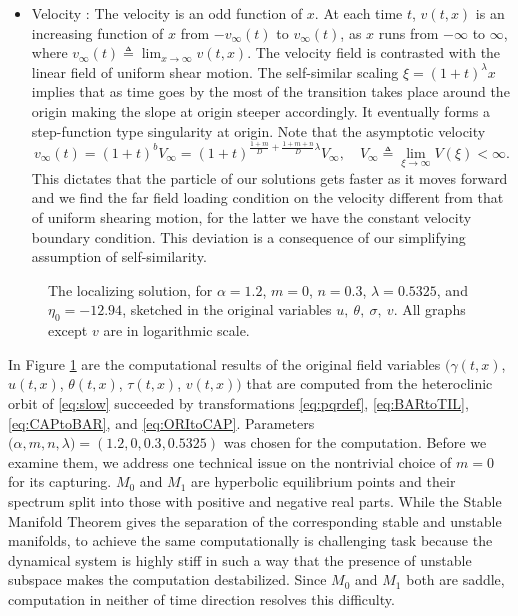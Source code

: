 \documentclass[a4paper,11pt]{article}
\def\red{\color{red}}
\theoremstyle{remark}
\begin{document}
\begin{itemize}
\item Velocity : The velocity is an odd function of $x$. At each time $t$, $v(t,x)$ is an increasing function of $x$ from $-v_\infty(t)$ to $v_\infty(t)$, as $x$ runs from $-\infty$ to $\infty$, where $v_\infty(t)\triangleq \lim_{x \rightarrow \infty} v(t,x)$. The velocity field is contrasted with the linear field of uniform shear motion. The self-similar scaling  $\xi=(1+t)^\lambda x$ implies that as time goes by the most of the transition takes place around the origin making the slope at origin steeper accordingly. It eventually forms a step-function type singularity at origin. Note that the asymptotic velocity $$v_\infty(t)=(1+t)^{b}V_\infty = (1+t)^{\frac{1+m}{D} + \frac{1+m+n}{D}\lambda}V_\infty, \quad V_\infty \triangleq \lim_{\xi \rightarrow \infty} V(\xi) <\infty.$$
This dictates that the particle of our solutions gets faster as it moves forward and we find the far field loading condition on the velocity different from that of uniform shearing motion, for the latter we have the constant velocity boundary condition. This deviation is a consequence of our simplifying assumption of self-similarity.
\end{itemize}

\begin{figure}[ht]
 \centering
\caption{The localizing solution, for $\alpha=1.2$, $m=0$, $n=0.3$, $\lambda =0.5325$, and $\eta_0=-12.94$, sketched in the original variables $u, \ \theta, \ \sigma, \ v$.
All graphs except $v$ are in logarithmic scale.} \label{fig:computation}
\end{figure}

In Figure \ref{fig:computation} are the computational results of the original field variables $\big(\gamma(t,x)$, $u(t,x)$, $\theta(t,x)$, $\tau(t,x)$, $v(t,x)\big)$ that are computed from the heteroclinic orbit of \eqref{eq:slow} succeeded by transformations \eqref{eq:pqrdef}, \eqref{eq:BARtoTIL}, \eqref{eq:CAPtoBAR}, and \eqref{eq:ORItoCAP}. Parameters $\big(\alpha,m,n,\lambda)=(1.2,0,0.3,0.5325)$ was chosen for the computation. Before we examine them, we address one technical issue on the nontrivial choice of $m=0$ for its capturing. $M_0$ and $M_1$ are hyperbolic equilibrium points and their spectrum split into those with positive and negative real parts. While the Stable Manifold Theorem gives the separation of the corresponding stable and unstable manifolds, to achieve the same computationally is challenging task because the dynamical system is highly stiff in such a way that the presence of unstable subspace makes the computation destabilized. Since $M_0$ and $M_1$ both are saddle, computation in neither of time direction resolves this difficulty. 
\end{document}
